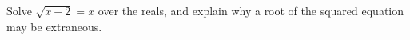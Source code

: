 Solve $\sqrt{x+2}=x$ over the reals, and explain why a root of the squared equation may be extraneous.

